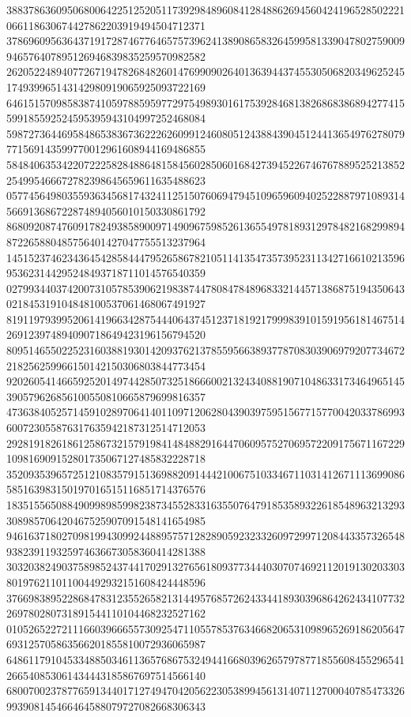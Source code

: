 \begin{DoxyCode}
      388378636095068006422512520511739298489608412848862694560424196528502221066118630674427862203919494504712371
      378696095636437191728746776465757396241389086583264599581339047802759009946576407895126946839835259570982582
      262052248940772671947826848260147699090264013639443745530506820349625245174939965143142980919065925093722169
      646151570985838741059788595977297549893016175392846813826868386894277415599185592524595395943104997252468084
      598727364469584865383673622262609912460805124388439045124413654976278079771569143599770012961608944169486855
      584840635342207222582848864815845602850601684273945226746767889525213852254995466672782398645659611635488623
      057745649803559363456817432411251507606947945109659609402522887971089314566913686722874894056010150330861792
      868092087476091782493858900971490967598526136554978189312978482168299894872265880485756401427047755513237964
      145152374623436454285844479526586782105114135473573952311342716610213596953623144295248493718711014576540359
      027993440374200731057853906219838744780847848968332144571386875194350643021845319104848100537061468067491927
      819119793995206141966342875444064374512371819217999839101591956181467514269123974894090718649423196156794520
      809514655022523160388193014209376213785595663893778708303906979207734672218256259966150142150306803844773454
      920260541466592520149744285073251866600213243408819071048633173464965145390579626856100550810665879699816357
      473638405257145910289706414011097120628043903975951567715770042033786993600723055876317635942187312514712053
      292819182618612586732157919841484882916447060957527069572209175671167229109816909152801735067127485832228718
      352093539657251210835791513698820914442100675103346711031412671113699086585163983150197016515116851714376576
      183515565088490998985998238734552833163550764791853589322618548963213293308985706420467525907091548141654985
      946163718027098199430992448895757128289059232332609729971208443357326548938239119325974636673058360414281388
      303203824903758985243744170291327656180937734440307074692112019130203303801976211011004492932151608424448596
      376698389522868478312355265821314495768572624334418930396864262434107732269780280731891544110104468232527162
      010526522721116603966655730925471105578537634668206531098965269186205647693125705863566201855810072936065987
      648611791045334885034611365768675324944166803962657978771855608455296541266540853061434443185867697514566140
      680070023787765913440171274947042056223053899456131407112700040785473326993908145466464588079727082668306343

\end{DoxyCode}
